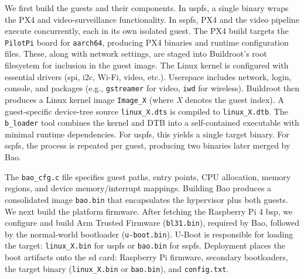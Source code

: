 We first build the guests and their components. In \gls{uspfs}, a single binary
wraps the PX4 and video-surveillance functionality. In \gls{sspfs}, PX4 and the
video pipeline execute concurrently, each in its own isolated guest.
%
The PX4 build targets the \lstinline{PilotPi} board for \lstinline{aarch64},
producing PX4 binaries and runtime configuration files. These, along with network
settings, are staged into Buildroot’s root filesystem for inclusion in the guest
image.
%
The Linux kernel is configured with essential drivers (\gls{spi}, \gls{i2c},
Wi-Fi, video, etc.). Userspace includes network, login, console, and packages
(e.g., \lstinline{gstreamer} for video, \lstinline{iwd} for wireless). Buildroot
then produces a Linux kernel image \lstinline{Image_X} (where \emph{X} denotes
the guest index). A guest-specific device-tree source
\lstinline{linux_X.dts} is compiled to \lstinline{linux_X.dtb}. The
\lstinline{b_loader} tool combines the kernel and DTB into a self-contained
executable with minimal runtime dependencies.
%
For \gls{uspfs}, this yields a single target binary. For \gls{sspfs}, the process
is repeated per guest, producing two binaries later merged by Bao.

The \lstinline{bao_cfg.c} file specifies guest paths, entry points, CPU
allocation, memory regions, and device memory/interrupt mappings. Building Bao
produces a consolidated image \lstinline{bao.bin} that encapsulates the
hypervisor plus both guests.
%
We next build the platform firmware. After fetching the Raspberry Pi 4 \gls{bsp},
we configure and build Arm Trusted Firmware (\lstinline{bl31.bin}), required by
Bao, followed by the normal-world bootloader (\lstinline{u-boot.bin}). U-Boot is
responsible for loading the target: \lstinline{linux_X.bin} for \gls{uspfs} or
\lstinline{bao.bin} for \gls{sspfs}.
%
Deployment places the boot artifacts onto the \gls{sd} card: Raspberry Pi
firmware, secondary bootloaders, the target binary (\lstinline{linux_X.bin} or
\lstinline{bao.bin}), and \lstinline{config.txt}.

